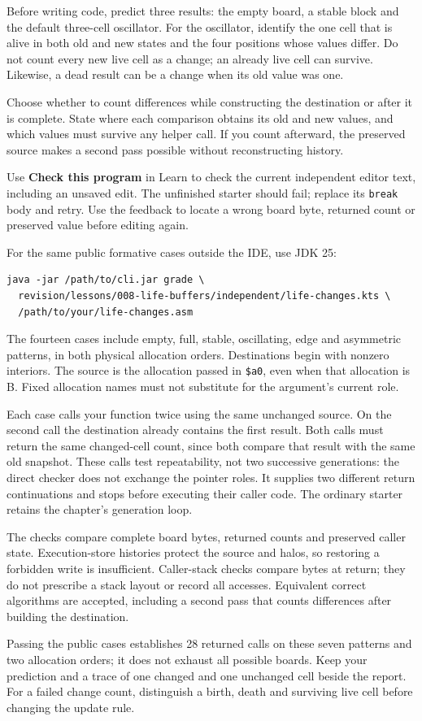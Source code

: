 Before writing code, predict three results: the empty board, a stable block and the
default three-cell oscillator. For the oscillator, identify the one cell that is
alive in both old and new states and the four positions whose values differ.
Do not count every new live cell as a change; an already live cell can survive.
Likewise, a dead result can be a change when its old value was one.

Choose whether to count differences while constructing the destination or after
it is complete. State where each comparison obtains its old and new values, and
which values must survive any helper call. If you count afterward, the preserved
source makes a second pass possible without reconstructing history.

Use \textbf{Check this program} in Learn to check the current independent
editor text, including an unsaved edit. The unfinished starter should fail;
replace its \texttt{break} body and retry. Use the feedback to locate a wrong
board byte, returned count or preserved value before editing again.

For the same public formative cases outside the IDE, use JDK 25:
\begin{verbatim}
java -jar /path/to/cli.jar grade \
  revision/lessons/008-life-buffers/independent/life-changes.kts \
  /path/to/your/life-changes.asm
\end{verbatim}
The fourteen cases include empty, full, stable, oscillating, edge and asymmetric
patterns, in both physical allocation orders. Destinations begin with nonzero
interiors. The source is the allocation passed in \texttt{\$a0}, even when that
allocation is B. Fixed allocation names must not substitute for the argument's
current role.

Each case calls your function twice using the same unchanged source. On the
second call the destination already contains the first result. Both calls must
return the same changed-cell count, since both compare that result with the
same old snapshot. These calls test repeatability, not two successive
generations: the direct checker does not exchange the pointer roles. It supplies
two different return continuations and stops before executing their caller code.
The ordinary starter retains the chapter's generation loop.

The checks compare complete board bytes, returned counts and preserved caller
state. Execution-store histories protect the source and halos, so restoring a
forbidden write is insufficient. Caller-stack checks compare bytes at return;
they do not prescribe a stack layout or record all accesses. Equivalent correct
algorithms are accepted, including a second pass that counts differences after
building the destination.

Passing the public cases establishes 28 returned calls on these seven patterns
and two allocation orders; it does not exhaust all possible boards. Keep your
prediction and a trace of one changed and one unchanged cell beside the report.
For a failed change count, distinguish a birth, death and surviving live cell
before changing the update rule.


